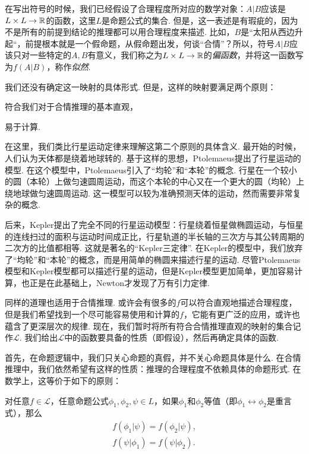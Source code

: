 在写出符号的时候，我们已经假设了合理程度所对应的数学对象：$A|B$应该是$L\times L\to\mathbb{R}$的函数，这里$L$是命题公式的集合. 但是，这一表述是有瑕疵的，因为不是所有的前提到结论的推理都可以用合理程度来描述. 比如，$B$是“太阳从西边升起“，前提根本就是一个假命题，从假命题出发，何谈“合情”？所以，符号$A|B$应该只对一些特定的$A,B$有意义，我们称之为$L\times L\to\mathbb{R}$的\textit{偏函数}，并将这一函数写为$f(A|B)$，称作\textit{似然}.

我们还没有确定这一映射的具体形式. 但是，这样的映射要满足两个原则：
\begin{enumerate*}
    \item 符合我们对于合情推理的基本直观，
    \item 易于计算.
\end{enumerate*}

在这里，我们类比行星运动定律来理解这第二个原则的具体含义. 最开始的时候，人们认为天体都是绕着地球转的. 基于这样的思想，Ptolemaeus提出了行星运动的模型. 在这个模型中，Ptolemaeus引入了“均轮”和“本轮”的概念. 行星在一个较小的圆（本轮）上做匀速圆周运动，而这个本轮的中心又在一个更大的圆（均轮）上绕地球做匀速圆周运动. 这一模型可以较为准确预测天体的运动，然而需要非常复杂的概念. 

后来，Kepler提出了完全不同的行星运动模型：行星绕着恒星做椭圆运动，与恒星的连线扫过的面积与运动时间成正比，行星轨道的半长轴的三次方与其公转周期的二次方的比值都相等. 这就是著名的“Kepler三定律”. 在Kepler的模型中，我们放弃了“均轮”和“本轮”的概念，而是用简单的椭圆来描述行星的运动. 尽管Ptolemaeus模型和Kepler模型都可以描述行星的运动，但是Kepler模型更加简单，更加容易计算，也正是在此基础上，Newton才发现了万有引力定律. 

同样的道理也适用于合情推理. 或许会有很多的$f$可以符合直观地描述合理程度，但是我们希望找到一个尽可能容易使用和计算的$f$，它能有更广泛的应用，或许也蕴含了更深层次的规律. 现在，我们暂时将所有符合合情推理直观的映射的集合记作$\mathcal L$. 我们给出$\mathcal L$中的函数要具备的性质（即假设），然后再确定具体的函数. 

首先，在命题逻辑中，我们只关心命题的真假，并不关心命题具体是什么. 在合情推理中，我们依然希望有这样的性质：推理的合理程度不依赖具体的命题形式. 在数学上，这等价于如下的原则：

\begin{principle}[等值原则]
    对任意$f\in\mathcal L$，任意命题公式$\phi_1,\phi_2,\psi\in L$，如果$\phi_1$和$\phi_2$等值（即$\phi_1\leftrightarrow\phi_2$是重言式），那么
    \begin{gather*}
        f(\phi_1|\psi) = f(\phi_2|\psi),\\
        f(\psi|\phi_1) = f(\psi|\phi_2).
        \end{gather*}
\end{principle}


